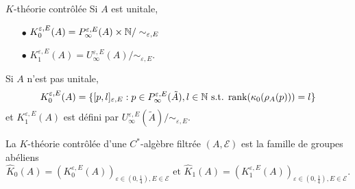 \begin{frame}{$K$-théorie contrôlée}
Si $A$ est unitale,
\begin{itemize}
\item[$\bullet$] $K_0^{\varepsilon,E}(A) = P^{\varepsilon, E}_\infty(A)\times \mathbb N / \sim_{\varepsilon,E}$ 
\item[$\bullet$] $K_1^{\varepsilon,E}(A) = U^{\varepsilon, E}_\infty(A) / \sim_{\varepsilon,E}$.
\end{itemize}

Si $A$ n'est pas unitale,  
\[K_0^{\varepsilon,E}(A) = \{[p,l]_{\varepsilon,E} : p\in P^{\varepsilon,E}_\infty (\tilde A), l\in \mathbb N \text{ s.t. rank}(\kappa_0(\rho_A(p)))=l \}\]
et $K_1^{\varepsilon,E}(A)$ est défini par $U_\infty^{\varepsilon,E}(\tilde A)/ \sim_{\varepsilon,E}$.\\

\begin{definitionfr}
La $K$-théorie contrôlée d'une $C^*$-algèbre filtrée $(A,\mathcal E)$ est la famille de groupes abéliens 
\[\hat K_0(A) = (K_0^{\varepsilon,E}(A))_{\varepsilon\in (0,\frac{1}{4}),E\in\mathcal E} \text{ et } \hat K_1(A) = (K_1^{\varepsilon,E}(A))_{\varepsilon\in (0,\frac{1}{4}),E\in\mathcal E}.\]
\end{definitionfr}
\end{frame}













































